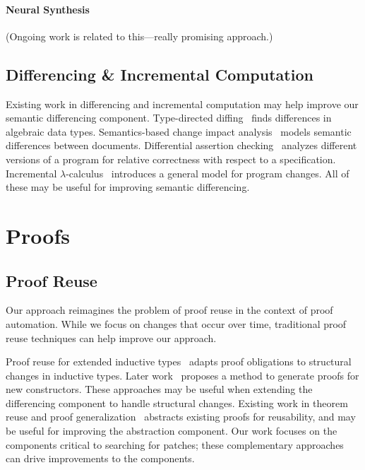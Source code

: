 \paragraph{Neural Synthesis} (Ongoing work is related to this---really promising approach.)

\subsection{Differencing \& Incremental Computation}


Existing work in differencing and incremental computation may help 
improve our semantic differencing component.
Type-directed diffing~\cite{Miraldo:2017:TDS:3122975.3122976}
finds differences in algebraic data types.
Semantics-based change impact analysis~\cite{Autexier:2010:SCI:1860559.1860580} models semantic differences
between documents.
Differential assertion checking~\cite{differential-assertion-checking-2} analyzes different
versions of a program for relative correctness with respect to a specification.
Incremental $\lambda$-calculus~\cite{Cai:2014:TCH:2594291.2594304} introduces a general model for program changes.
All of these may be useful for improving semantic differencing.


\section{Proofs}

\subsection*{Proof Reuse}


Our approach reimagines the problem of proof reuse in the context of proof automation.
While we focus on changes that occur over time, traditional proof reuse techniques can help
improve our approach.

Proof reuse for extended inductive types~\cite{Boite2004} adapts proof obligations
to structural changes in inductive types. Later work~\cite{Mulhern06proofweaving} proposes a method
to generate proofs for new constructors. These approaches may be useful when extending the differencing
component to handle structural changes. Existing work in theorem reuse and proof generalization~\cite{Felty1994, pons00, Johnsen2004} abstracts existing proofs for reusability, and may be useful
for improving the abstraction component. %
Our work focuses on the components critical to searching for patches; these complementary approaches
can drive improvements to the components.

